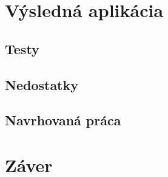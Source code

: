 \chapter{Výsledná aplikácia}

\section{Testy}

\section{Nedostatky}

\section{Navrhovaná práca}

\chapter{Záver}

